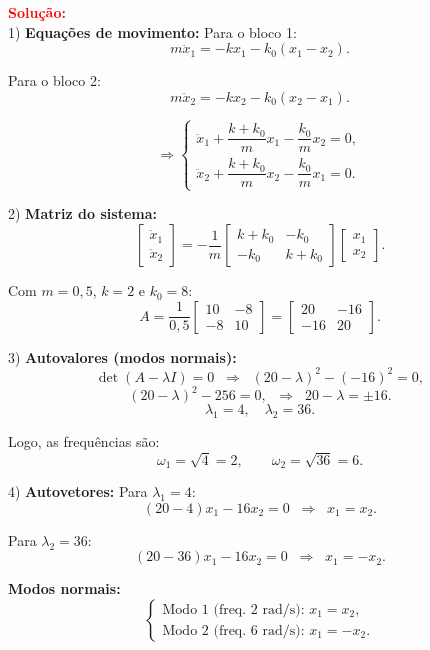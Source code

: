 \documentclass[a4paper,12pt]{article}
\begin{document}
\begin{flushleft}
\vspace{0.5cm}

\textcolor{red}{\textbf{Solu\c{c}\~ao:}}\\[2mm]

1) \textbf{Equa\c{c}\~oes de movimento:}  
Para o bloco 1:
\[
m\ddot{x}_1 = -k x_1 - k_0(x_1 - x_2).
\]

Para o bloco 2:
\[
m\ddot{x}_2 = -k x_2 - k_0(x_2 - x_1).
\]

\[
\Rightarrow 
\begin{cases}
\ddot{x}_1 + \dfrac{k+k_0}{m}x_1 - \dfrac{k_0}{m}x_2 = 0, \\
\ddot{x}_2 + \dfrac{k+k_0}{m}x_2 - \dfrac{k_0}{m}x_1 = 0.
\end{cases}
\]

2) \textbf{Matriz do sistema:}  
\[
\begin{bmatrix}
\ddot{x}_1 \\ \ddot{x}_2
\end{bmatrix}
= -\frac{1}{m}
\begin{bmatrix}
k+k_0 & -k_0 \\
-k_0 & k+k_0
\end{bmatrix}
\begin{bmatrix}
x_1 \\ x_2
\end{bmatrix}.
\]

Com $m=0,5$, $k=2$ e $k_0=8$:
\[
A=\frac{1}{0,5}
\begin{bmatrix}
10 & -8 \\ -8 & 10
\end{bmatrix}
=
\begin{bmatrix}
20 & -16 \\ -16 & 20
\end{bmatrix}.
\]

3) \textbf{Autovalores (modos normais):}  
\[
\det(A-\lambda I)=0 \;\;\Rightarrow\;\;
(20-\lambda)^2-(-16)^2=0,
\]
\[
(20-\lambda)^2-256=0,
\;\;\Rightarrow\;\;
20-\lambda=\pm 16.
\]
\[
\lambda_1=4, \quad \lambda_2=36.
\]

Logo, as frequ\^encias s\~ao:
\[
\omega_1=\sqrt{4}=2, \qquad \omega_2=\sqrt{36}=6.
\]

4) \textbf{Autovetores:}  
Para $\lambda_1=4$:  
\[
(20-4)x_1-16x_2=0 \;\;\Rightarrow\;\; x_1=x_2.
\]

Para $\lambda_2=36$:  
\[
(20-36)x_1-16x_2=0 \;\;\Rightarrow\;\; x_1=-x_2.
\]

\textbf{Modos normais:}
\[
\begin{cases}
\text{Modo 1 (freq. 2 rad/s): } x_1=x_2, \\
\text{Modo 2 (freq. 6 rad/s): } x_1=-x_2.
\end{cases}
\]


\end{flushleft}
\end{document}
